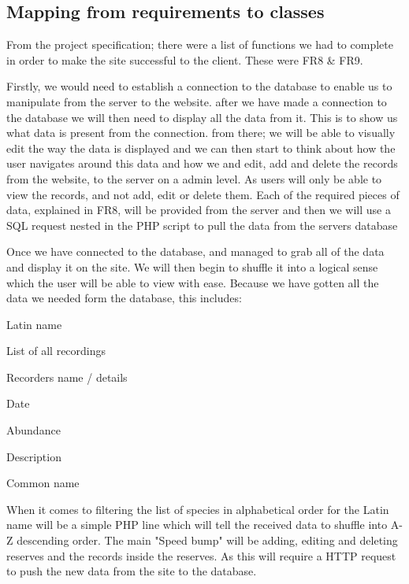 \documentclass[12pt]{article}
\begin{document}
  \subsection{Mapping from requirements to classes}
    From the project specification; there were a list of functions we had to complete in order to make the site successful to the client. These were FR8 \& FR9.

Firstly, we would need to establish a connection to the database to enable us to manipulate from the server to the website. after we have made a connection to the database we will then need to display all the data from it. This is to show us what data is present from the connection. from there; we will be able to visually edit the way the data is displayed and we can then start to think about how the user navigates around this data and how we and edit, add and delete the records from the website, to the server on a admin level. As users will only be able to view the records, and not add, edit or delete them. Each of the required pieces of data, explained in FR8, will be provided from the server and then we will use a SQL request nested in the PHP script to pull the data from the servers database

Once we have connected to the database, and managed to grab all of the data and display it on the site. We will then begin to shuffle it into a logical sense which the user will be able to view with ease. Because we have gotten all the data we needed form the database, this includes:

\begin{itemize}
\begin{multicols}{2}
  \item Latin name
  \item List of all recordings
  \item Recorders name / details
  \item Date
  \item Abundance
  \item Description
  \item Common name
  \end{multicols}
\end{itemize}

When it comes to filtering the list of species in alphabetical order for the Latin name will be a simple PHP line which will tell the received data to shuffle into A-Z descending order.
The main "Speed bump" will be adding, editing and deleting reserves and the records inside the reserves. As this will require a HTTP request to push the new data from the site to the database.
\end{document}
